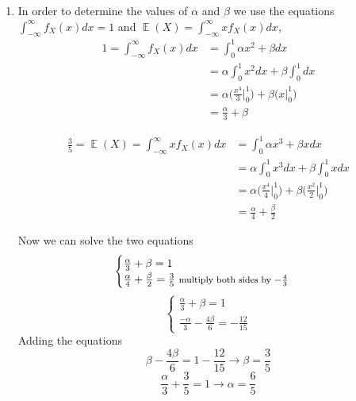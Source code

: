 \documentclass[a4paper, 11pt, oneside]{article}
\DeclareMathOperator{\EX}{\mathbb{E}}
\begin{document}
\begin{enumerate}
\begin{enumerate}
\item  
In order to determine the values of $\alpha$ and $\beta$ we use the equations
 $\int_{-\infty}^{\infty} f_X(x) dx = 1$ and $\EX(X) = \int_{-\infty}^{\infty} x f_X(x) dx$,
 \begin{align*}\label{ff}
1 = \int_{-\infty}^{\infty} f_X(x) dx &=
\int_{0}^{1} \alpha x^2 + \beta dx  \\&=
\alpha \int_{0}^{1}  x^2 dx +  \beta \int_{0}^{1}  dx  \\&=
\alpha \Big(\frac{x^3}{3}\Bigr|^1_0\Big) + \beta \Big(x\Bigr|^1_0\Big) \\&=
 \frac{\alpha}{3} + \beta
 \end{align*}
 
 \begin{align*}
\frac{3}{5} = \EX(X) =\int_{-\infty}^{\infty} x f_X(x) dx &=
\int_{0}^{1} \alpha x^3 + \beta x dx  \\&=
\alpha \int_{0}^{1}  x^3 dx +  \beta \int_{0}^{1}  x dx  \\&=
\alpha \Big(\frac{x^4}{4}\Bigr|^1_0\Big) + \beta \Big(\frac{x^2}{2}\Bigr|^1_0\Big) \\&=
 \frac{\alpha}{4} +  \frac{\beta}{2}
 \end{align*}
 
Now we can solve the two equations
 \begin{equation*}
  \begin{cases}
    \frac{\alpha}{3} + \beta = 1\\
     \frac{\alpha}{4} +  \frac{\beta}{2} = \frac{3}{5}   \text{    \footnotesize multiply both sides by $-\frac{4}{3}$}
  \end{cases} 
  \end{equation*}
   \begin{equation*}
    \begin{cases}
    \frac{\alpha}{3} + \beta = 1\\
     \frac{-\alpha}{3} -  \frac{4\beta}{6} = -\frac{12}{15}
  \end{cases}
\end{equation*}
Adding the equations
\begin{equation*}
\beta -  \frac{4\beta}{6} = 1 - \frac{12}{15} \rightarrow \beta = \frac{3}{5}
\end{equation*}
\begin{equation*}
\frac{\alpha}{3} +  \frac{3}{5} = 1 \rightarrow\alpha = \frac{6}{5}
\end{equation*}


\end{enumerate}
\end{enumerate}
\end{document}
